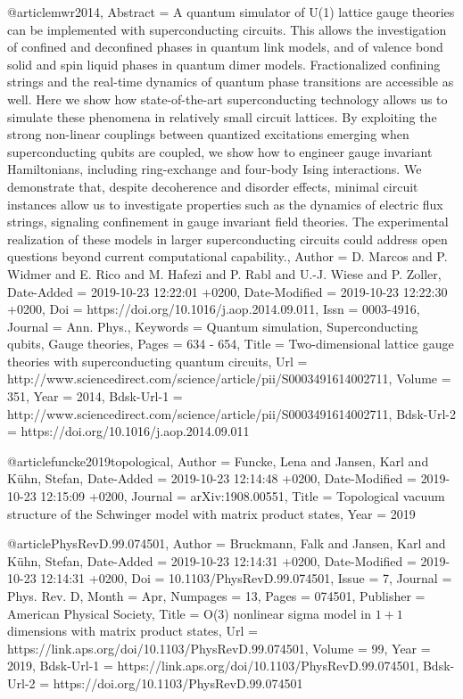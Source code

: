 \documentclass[epj,final]{svjour}
\begin{document}
@article{mwr2014,
	Abstract = {A quantum simulator of U(1) lattice gauge theories can be implemented with superconducting circuits. This allows the investigation of confined and deconfined phases in quantum link models, and of valence bond solid and spin liquid phases in quantum dimer models. Fractionalized confining strings and the real-time dynamics of quantum phase transitions are accessible as well. Here we show how state-of-the-art superconducting technology allows us to simulate these phenomena in relatively small circuit lattices. By exploiting the strong non-linear couplings between quantized excitations emerging when superconducting qubits are coupled, we show how to engineer gauge invariant Hamiltonians, including ring-exchange and four-body Ising interactions. We demonstrate that, despite decoherence and disorder effects, minimal circuit instances allow us to investigate properties such as the dynamics of electric flux strings, signaling confinement in gauge invariant field theories. The experimental realization of these models in larger superconducting circuits could address open questions beyond current computational capability.},
	Author = {D. Marcos and P. Widmer and E. Rico and M. Hafezi and P. Rabl and U.-J. Wiese and P. Zoller},
	Date-Added = {2019-10-23 12:22:01 +0200},
	Date-Modified = {2019-10-23 12:22:30 +0200},
	Doi = {https://doi.org/10.1016/j.aop.2014.09.011},
	Issn = {0003-4916},
	Journal = {Ann. Phys.},
	Keywords = {Quantum simulation, Superconducting qubits, Gauge theories},
	Pages = {634 - 654},
	Title = {Two-dimensional lattice gauge theories with superconducting quantum circuits},
	Url = {http://www.sciencedirect.com/science/article/pii/S0003491614002711},
	Volume = {351},
	Year = {2014},
	Bdsk-Url-1 = {http://www.sciencedirect.com/science/article/pii/S0003491614002711},
	Bdsk-Url-2 = {https://doi.org/10.1016/j.aop.2014.09.011}}

@article{funcke2019topological,
	Author = {Funcke, Lena and Jansen, Karl and K{\"u}hn, Stefan},
	Date-Added = {2019-10-23 12:14:48 +0200},
	Date-Modified = {2019-10-23 12:15:09 +0200},
	Journal = {arXiv:1908.00551},
	Title = {Topological vacuum structure of the Schwinger model with matrix product states},
	Year = {2019}}

@article{PhysRevD.99.074501,
	Author = {Bruckmann, Falk and Jansen, Karl and K\"uhn, Stefan},
	Date-Added = {2019-10-23 12:14:31 +0200},
	Date-Modified = {2019-10-23 12:14:31 +0200},
	Doi = {10.1103/PhysRevD.99.074501},
	Issue = {7},
	Journal = {Phys. Rev. D},
	Month = {Apr},
	Numpages = {13},
	Pages = {074501},
	Publisher = {American Physical Society},
	Title = {O(3) nonlinear sigma model in $1+1$ dimensions with matrix product states},
	Url = {https://link.aps.org/doi/10.1103/PhysRevD.99.074501},
	Volume = {99},
	Year = {2019},
	Bdsk-Url-1 = {https://link.aps.org/doi/10.1103/PhysRevD.99.074501},
	Bdsk-Url-2 = {https://doi.org/10.1103/PhysRevD.99.074501}}
\end{document}

